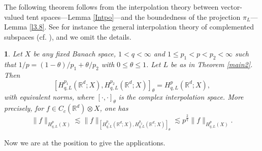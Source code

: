 \documentclass[oneside,english,a4wide]{amsart}
\numberwithin{equation}{section}
\numberwithin{figure}{section}
\theoremstyle{plain}
\newtheorem{thm}{\protect\theoremname}[section]
\theoremstyle{plain}
\theoremstyle{definition}
\theoremstyle{plain}
\theoremstyle{remark}
\theoremstyle{definition}
\theoremstyle{remark}
\theoremstyle{definition}
\providecommand{\theoremname}{Theorem}
\newcommand{\real}{{\mathbb R}}
\newcommand{\Q}{{\mathcal Q}}
\newcommand{\8}{+\infty}
\renewcommand{\1}{\mathbbm{1}}
\begin{document}
{The following theorem follows from the interpolation theory between vector-valued tent spaces---Lemma \ref{Intpo}---and the boundedness of the projection $\pi_L$---Lemma \ref{l3.8}. See for instance the general interpolation theory of complemented subspaces (cf. \cite[Section 1.17]{Triebel1978}), and we omit the details.
 \begin{thm}\label{thm:interHL}
  Let $X$ be any fixed Banach space, $1<q<\infty$ and $1 \leq p_1 < p < p_2 < \infty$ such that $1/p = (1-\theta)/p_1 + \theta/p_2$ with $0\leq\theta\leq1$. Let $L$ be as in Theorem \ref{main2}.
  Then
   \[
        [H^{p_1}_{q, L}(\real^d; X), H^{p_2}_{q, L}(\real^d;X)]_\theta = H^p_{q, L}(\real^d;X),
   \]
   with equivalent norms, where $[\cdot, \cdot]_\theta$ is the complex interpolation space. More precisely, for $f\in C_c(\real^d)\otimes X$, one has
   \[
        \|f \|_{H^p_{q, L}(X)} \lesssim \| f \|_{[H^{p_1}_{q, L}(\real^d; X), H^{p_2}_{q, L}(\real^d;X)]_\theta} \lesssim p^{\frac{2}{q}} \| f \|_{H^p_{q, L}(X)}.
   \]
\end{thm}
 




Now we are at the position to give the applications.

}
\end{document}
